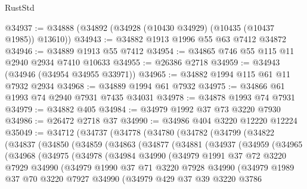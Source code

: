 \begin{lexlean}{RustStd}
\begin{coremodule}
@34937 := @34888 (@34892 (@34928 (@10430 @34929) (@10435 (@10437 @1985)) @13610))
@34943 := @34882 @1913 @1996 @55 @63 @7412 @34872
@34946 := @34889 @1913 @55 @7412
@34954 := @34865 @746 @55 @115 @11 @2940 @2934 @7410 @10633
@34955 := @26386 @2718
@34959 := @34943 (@34946 (@34954 @34955 @33971))
@34965 := @34882 @1994 @115 @61 @11 @7932 @2934
@34968 := @34889 @1994 @61 @7932
@34975 := @34866 @61 @1993 @74 @2940 @7931 @7435 @34031
@34978 := @34878 @1993 @74 @7931
@34979 := @34882 @405
@34984 := @34979 @1992 @37 @73 @3220 @7930
@34986 := @26472 @2718 @37
@34990 := @34986 @404 @3220 @12220 @12224
@35049 := @34712
    (@34737
      (@34778
        (@34780
          (@34782
            (@34799
              (@34822
                (@34837
                  (@34850
                    (@34859
                      (@34863
                        (@34877
                          (@34881
                            (@34937
                              (@34959
                                (@34965
                                  (@34968
                                    (@34975
                                      (@34978
                                        (@34984
                                          @34990
                                          (@34979
                                            @1991
                                            @37
                                            @72
                                            @3220
                                            @7929
                                            @34990
                                            (@34979
                                              @1990
                                              @37
                                              @71
                                              @3220
                                              @7928
                                              @34990
                                              (@34979
                                                @1989
                                                @37
                                                @70
                                                @3220
                                                @7927
                                                @34990
                                                (@34979
                                                  @429
                                                  @37
                                                  @39
                                                  @3220
                                                  @3786

\end{coremodule}
\end{lexlean}

